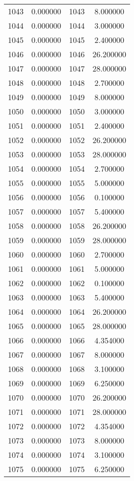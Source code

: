 \documentclass[12pt]{article}
\begin{document}
\begin{longtable}{@{}cccc@{}}
1043 & 0.000000 & 1043 & 8.000000 \\
1044 & 0.000000 & 1044 & 3.000000 \\
1045 & 0.000000 & 1045 & 2.400000 \\
1046 & 0.000000 & 1046 & 26.200000 \\
1047 & 0.000000 & 1047 & 28.000000 \\
1048 & 0.000000 & 1048 & 2.700000 \\
1049 & 0.000000 & 1049 & 8.000000 \\
1050 & 0.000000 & 1050 & 3.000000 \\
1051 & 0.000000 & 1051 & 2.400000 \\
1052 & 0.000000 & 1052 & 26.200000 \\
1053 & 0.000000 & 1053 & 28.000000 \\
1054 & 0.000000 & 1054 & 2.700000 \\
1055 & 0.000000 & 1055 & 5.000000 \\
1056 & 0.000000 & 1056 & 0.100000 \\
1057 & 0.000000 & 1057 & 5.400000 \\
1058 & 0.000000 & 1058 & 26.200000 \\
1059 & 0.000000 & 1059 & 28.000000 \\
1060 & 0.000000 & 1060 & 2.700000 \\
1061 & 0.000000 & 1061 & 5.000000 \\
1062 & 0.000000 & 1062 & 0.100000 \\
1063 & 0.000000 & 1063 & 5.400000 \\
1064 & 0.000000 & 1064 & 26.200000 \\
1065 & 0.000000 & 1065 & 28.000000 \\
1066 & 0.000000 & 1066 & 4.354000 \\
1067 & 0.000000 & 1067 & 8.000000 \\
1068 & 0.000000 & 1068 & 3.100000 \\
1069 & 0.000000 & 1069 & 6.250000 \\
1070 & 0.000000 & 1070 & 26.200000 \\
1071 & 0.000000 & 1071 & 28.000000 \\
1072 & 0.000000 & 1072 & 4.354000 \\
1073 & 0.000000 & 1073 & 8.000000 \\
1074 & 0.000000 & 1074 & 3.100000 \\
1075 & 0.000000 & 1075 & 6.250000 \\

\end{longtable}
\end{document}
